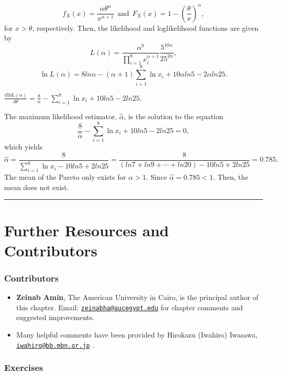\documentclass[]{book}
\providecommand{\tightlist}{%
  \setlength{\itemsep}{0pt}\setlength{\parskip}{0pt}}
\theoremstyle{definition}
\theoremstyle{definition}
\theoremstyle{definition}
\theoremstyle{remark}
\begin{document}
\[f_{X}\left( x \right) = \frac{\alpha\theta^{\alpha}}{x^{\alpha + 1}} \ \ \text{and} \ \ F_{X}\left( x \right) = 1 - \left( \frac{\theta}{x} \right)^{\alpha},\]
for \(x > \theta\), respectively. Then, the likelihood and loglikelihood
functions are given by
\[L\left( \alpha \right) = \frac{\alpha^{8}}{\prod_{i = 1}^{8}x_{i}^{\alpha + 1}}\frac{5^{10\alpha}}{25^{2\alpha}},\]
\[\ln L \left( \alpha \right) = 8ln\alpha - \left( \alpha + 1 \right)\sum_{i = 1}^{8}{\ln x_{i}} + 10\alpha ln5 - 2\alpha ln25.\]

\(\frac{\text{dlnL}\left( \alpha \right)}{d \theta} = \frac{8}{\alpha} - \sum_{i = 1}^{8}{\ln x_{i}} + 10ln5 - 2ln25\).

The maximum likelihood estimator, \(\hat{\alpha}\), is the solution to
the equation
\[\frac{8}{\hat{\alpha}} - \sum_{i = 1}^{8}{\ln x_{i}} + 10ln5 - 2ln25 = 0,\]which
yields
\[\hat{\alpha} = \frac{8}{\sum_{i = 1}^{8}{\ln x_{i}} - 10ln5 + 2ln25} = \frac{8}{(ln7 + ln9 + \cdots + ln20) - 10ln5 + 2ln25} = 0.785.\]
The mean of the Pareto only exists for \(\alpha > 1\). Since
\(\hat{\alpha} = 0.785 < 1\). Then, the mean does not exist.

\begin{center}\rule{0.5\linewidth}{\linethickness}\end{center}

\section{Further Resources and
Contributors}\label{LM-further-reading-and-resources}

\subsubsection*{Contributors}\label{contributors-2}

\begin{itemize}
\tightlist
\item
  \textbf{Zeinab Amin}, The American University in Cairo, is the
  principal author of this chapter. Email:
  \href{mailto:zeinabha@aucegypt.edu}{\nolinkurl{zeinabha@aucegypt.edu}}
  for chapter comments and suggested improvements.
\item
  Many helpful comments have been provided by Hirokazu (Iwahiro)
  Iwasawa,
  \href{mailto:iwahiro@bb.mbn.or.jp}{\nolinkurl{iwahiro@bb.mbn.or.jp}} .
\end{itemize}

\subsubsection*{Exercises}\label{exercises-1}
\end{document}
